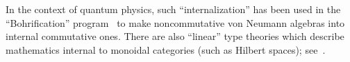 \documentclass[copyright,12pt]{eptcs}
\makeatletter
\newcommand{\type}{\ensuremath{\mathsf{Type}}\xspace}
\def\jd#1{\@jd#1\ej}
\def\@jd#1|-#2\ej{\@@jd#1,,\;\vdash\;\left(#2\right)}
\def\@@jd#1,{\@ifmtarg{#1}{\let\next=\relax}{\left(#1\right)\let\next=\@@@jd}\next}
\def\@@@jd#1,{\@ifmtarg{#1}{\let\next=\relax}{,\,\left(#1\right)\let\next=\@@@jd}\next}
\makeatother
\begin{document}
%
%
%
In the context of quantum physics, such ``internalization'' has been used in the ``Bohrification'' program~\cite{Bohrification} to make noncommutative von Neumann algebras into internal commutative ones.
There are also ``linear'' type theories which describe mathematics internal to monoidal categories (such as Hilbert spaces); see~\cite{Rosetta}.
\end{document}
